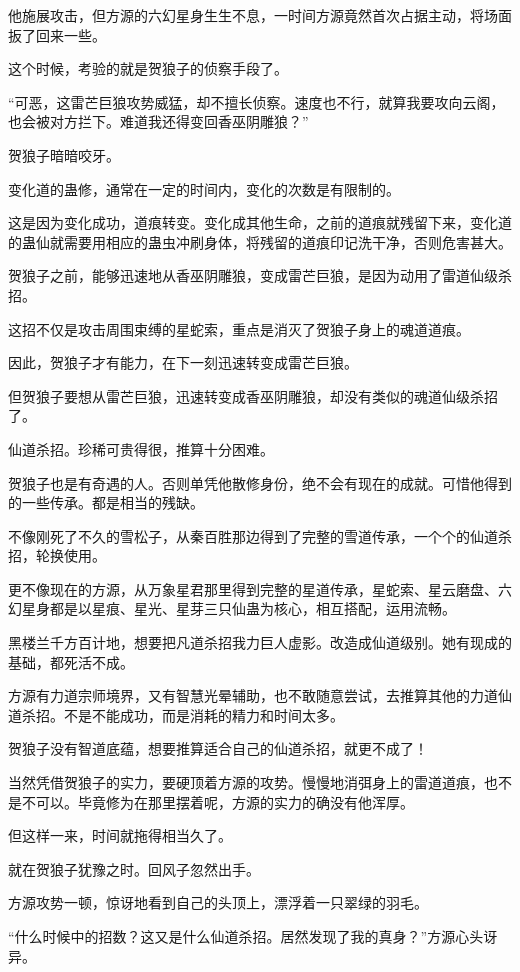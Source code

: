 \begin{this_body}
他施展攻击，但方源的六幻星身生生不息，一时间方源竟然首次占据主动，将场面扳了回来一些。

这个时候，考验的就是贺狼子的侦察手段了。

“可恶，这雷芒巨狼攻势威猛，却不擅长侦察。速度也不行，就算我要攻向云阁，也会被对方拦下。难道我还得变回香巫阴雕狼？”

贺狼子暗暗咬牙。

变化道的蛊修，通常在一定的时间内，变化的次数是有限制的。

这是因为变化成功，道痕转变。变化成其他生命，之前的道痕就残留下来，变化道的蛊仙就需要用相应的蛊虫冲刷身体，将残留的道痕印记洗干净，否则危害甚大。

贺狼子之前，能够迅速地从香巫阴雕狼，变成雷芒巨狼，是因为动用了雷道仙级杀招。

这招不仅是攻击周围束缚的星蛇索，重点是消灭了贺狼子身上的魂道道痕。

因此，贺狼子才有能力，在下一刻迅速转变成雷芒巨狼。

但贺狼子要想从雷芒巨狼，迅速转变成香巫阴雕狼，却没有类似的魂道仙级杀招了。

仙道杀招。珍稀可贵得很，推算十分困难。

贺狼子也是有奇遇的人。否则单凭他散修身份，绝不会有现在的成就。可惜他得到的一些传承。都是相当的残缺。

不像刚死了不久的雪松子，从秦百胜那边得到了完整的雪道传承，一个个的仙道杀招，轮换使用。

更不像现在的方源，从万象星君那里得到完整的星道传承，星蛇索、星云磨盘、六幻星身都是以星痕、星光、星芽三只仙蛊为核心，相互搭配，运用流畅。

黑楼兰千方百计地，想要把凡道杀招我力巨人虚影。改造成仙道级别。她有现成的基础，都死活不成。

方源有力道宗师境界，又有智慧光晕辅助，也不敢随意尝试，去推算其他的力道仙道杀招。不是不能成功，而是消耗的精力和时间太多。

贺狼子没有智道底蕴，想要推算适合自己的仙道杀招，就更不成了！

当然凭借贺狼子的实力，要硬顶着方源的攻势。慢慢地消弭身上的雷道道痕，也不是不可以。毕竟修为在那里摆着呢，方源的实力的确没有他浑厚。

但这样一来，时间就拖得相当久了。

就在贺狼子犹豫之时。回风子忽然出手。

方源攻势一顿，惊讶地看到自己的头顶上，漂浮着一只翠绿的羽毛。

“什么时候中的招数？这又是什么仙道杀招。居然发现了我的真身？”方源心头讶异。


\end{this_body}
